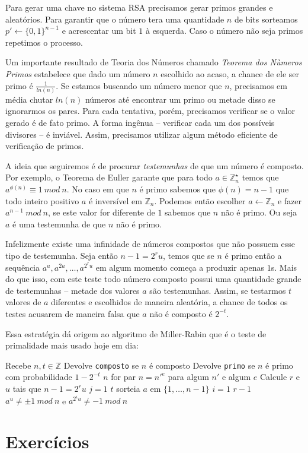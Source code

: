 Para gerar uma chave no sistema RSA precisamos gerar primos grandes e aleatórios.
Para garantir que o número tera uma quantidade $n$ de bits sorteamos $p' \leftarrow \{0,1\}^{n-1}$ e acrescentar um bit $1$ à esquerda.
Caso o número não seja primos repetimos o processo.

Um importante resultado de Teoria dos Números chamado {\em Teorema dos Nùmeros Primos} estabelece que dado um número $n$ escolhido ao acaso, a chance de ele ser primo é $\frac{1}{ln(n)}$.
Se estamos buscando um número menor que $n$, precisamos em média chutar $ln(n)$ números até encontrar um primo ou metade disso se ignorarmos os pares.
Para cada tentativa, porém, precisamos verificar se o valor gerado é de fato primo.
A forma ingênua -- verificar cada um dos possíveis divisores -- é inviável.
Assim, precisamos utilizar algum método eficiente de verificação de primos.

A ideia que seguiremos é de procurar {\em testemunhas} de que um número é composto.
Por exemplo, o Teorema de Euller garante que para todo $a \in \mathbb{Z}_n^\star$ temos que $a^{\phi(n)} \equiv 1\ mod\ n$.
No caso em que $n$ é primo sabemos que $\phi(n) = n - 1$ que todo inteiro positivo $a$ é inversível em $\mathbb{Z}_n$.
Podemos então escolher $a \leftarrow \mathbb{Z}_n$ e fazer $a^{n-1}\ mod\ n$, se este valor for diferente de $1$ sabemos que $n$ não é primo.
Ou seja $a$ é uma testemunha de que $n$ não é primo.

Infelizmente existe uma infinidade de números compostos que não possuem esse tipo de testemunha.
Seja então $n - 1 = 2^ru$, temos que se $n$ é primo então a sequência $a^u, a^{2u}, \dots, a^{2^ru}$ em algum momento começa a produzir apenas $1$s.
Mais do que isso, com este teste todo número composto possui uma quantidade grande de testemunhas -- metade dos valores $a$ são testemunhas.
Assim, se testarmos $t$ valores de $a$ diferentes e escolhidos de maneira aleatória, a chance de todos os testes acusarem de maneira falsa que $a$ não é composto é $2^{-t}$.

Essa estratégia dá origem ao algoritmo de Miller-Rabin \cite{Miller75,Rabin80} que é o teste de primalidade mais usado hoje em dia:

\begin{codebox}
\li \Comment Recebe $n, t \in \mathbb{Z}$
\li \Comment Devolve {\tt composto} se $n$ é composto
\li \Comment Devolve {\tt primo} se $n$ é primo com probabilidade $1 - 2^{-t}$
\li \If $n$ for par
\li   \Then {}
    \End
\li \If $n = n'^e$ para algum $n'$ e algum $e$
\li   \Then {}
    \End
\li  Calcule $r$ e $u$ tais que $n-1 = 2^ru$
\li \For $j = 1$ \To $t$
\li   \Do sorteia $a$ em $\{1, \dots, n-1\}$ 
\li   \For $i = 1$ \To $r-1$
\li     \Do \If $a^u \neq \pm 1\ mod\ n$ e $a^{2^iu} \neq -1\ mod\ n$
\li         \Then {}
            \End
      \End
    \End
\li {}
\end{codebox}

\section{Exercícios}
\label{sec:exercicios}


